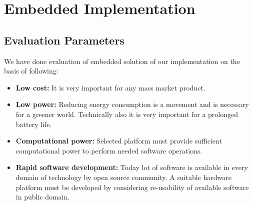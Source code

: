 
\chapter{Embedded Implementation} %
\section {Evaluation Parameters}
\label{Chapter3}
We have done evaluation of embedded solution of our implementation on
the basis of following:
\begin{itemize}
 \item \textbf{Low cost:} It is very important for any mass
 market product.
 \item \textbf{Low power:} Reducing energy consumption is a
 movement and is necessary for a greener world.
 Technically also it is very important for a prolonged
 battery life.
 \item \textbf{Computational power:} Selected platform must
 provide sufficient computational power to perform
 needed software operations.
 \item \textbf{Rapid software development:} Today lot of software
 is available in every domain of technology by open source
 community. A suitable hardware platform must be developed by considering
 re-usability of available software in public domain.
\end{itemize}
